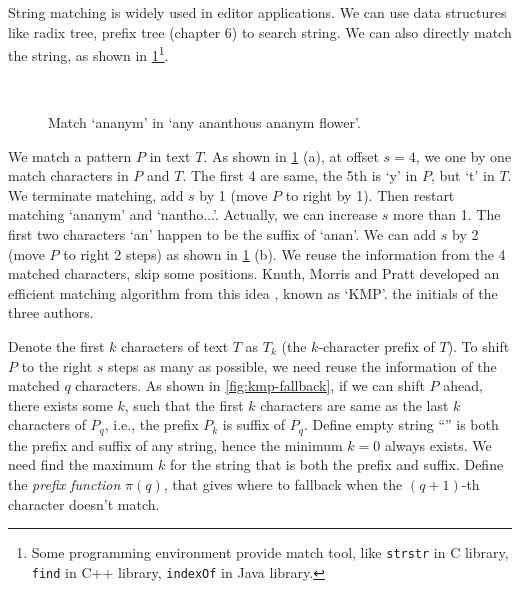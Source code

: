 \documentclass[b5paper]{article}
\begin{document}
String matching is widely used in editor applications. We can use data structures like radix tree, prefix tree (chapter 6) to search string. We can also directly match the string, as shown in \cref{fig:strstr}\footnote{Some programming environment provide match tool, like \texttt{strstr} in C library, \texttt{find} in C++ library, \texttt{indexOf} in Java library.}.

\begin{figure}[htbp]
 \centering
  \\
 \caption{Match `ananym' in `any ananthous ananym flower'.}
 \label{fig:strstr}
\end{figure}

 

We match a pattern $P$ in text $T$. As shown in \cref{fig:strstr} (a), at offset $s = 4$, we one by one match characters in $P$ and $T$. The first 4 are same, the 5th is `y' in $P$, but `t' in $T$. We terminate matching, add $s$ by 1 (move $P$ to right by 1). Then restart matching `ananym' and `nantho...'. Actually, we can increase $s$ more than 1. The first two characters `an' happen to be the suffix of `anan'. We can add $s$ by 2 (move $P$ to right 2 steps) as shown in \cref{fig:strstr} (b). We reuse the information from the 4 matched characters, skip some positions. Knuth, Morris and Pratt developed an efficient matching algorithm from this idea \cite{kmp}, known as `KMP'. the initials of the three authors.

Denote the first $k$ characters of text $T$ as $T_k$ (the $k$-character prefix of $T$). To shift $P$ to the right $s$ steps as many as possible, we need reuse the information of the matched $q$ characters. As shown in \cref{fig:kmp-fallback}, if we can shift $P$ ahead, there exists some $k$, such that the first $k$ characters are same as the last $k$ characters of $P_q$, i.e., the prefix $P_k$ is suffix of $P_q$. Define empty string ``'' is both the prefix and suffix of any string, hence the minimum $k = 0$ always exists. We need find the maximum $k$ for the string that is both the prefix and suffix. Define the {\em prefix function} $\pi(q)$, that gives where to fallback when the $(q + 1)$-th character doesn't match\cite{CLRS}.
\end{document}
